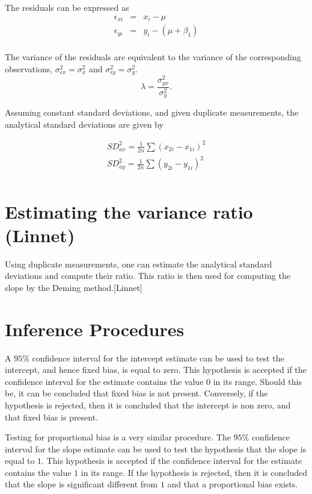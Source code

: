 \documentclass[12pt, a4paper]{report}
\theoremstyle{plain}
\theoremstyle{definition}
\theoremstyle{remark}
\begin{document}
The residuals can be expressed as
\begin{eqnarray*}
	\epsilon_{xi} &=& x_{i} - \mu  \\
	\epsilon_{yi} &=& y_{i} - (\mu + \beta_{1}) \\
\end{eqnarray*}

The variance of the residuals are equivalent to the variance of the corresponding observations, $\sigma^{2}_{\epsilon x} =
\sigma^{2}_{x}$ and $\sigma^{2}_{\epsilon y} = \sigma^{2}_{y}$.
\begin{equation}
	\lambda = \frac{\sigma^{2}_{yx}}{\sigma^{2}_{y}}.
\end{equation}

Assuming constant standard deviations, and given duplicate measurements, the analytical standard deviations are given by

\begin{eqnarray*}
	SD^{2}_{ax} = \frac{1}{2n} \sum (x_{2i} - x_{1i})^{2}\\
	SD^{2}_{ay} = \frac{1}{2n} \sum (y_{2i} - y_{1i})^{2}\\
\end{eqnarray*}


\section{Estimating the variance ratio (Linnet)}

Using duplicate measurements, one can estimate the analytical standard deviations and compute their ratio. This ratio is then used for computing the slope by the Deming method.[Linnet]



\section{Inference Procedures}
A $95\%$ confidence interval for the intercept estimate can be used to test the intercept, and hence fixed bias, is equal to
zero. This hypothesis is accepted if the confidence interval for the estimate contains the value $0$ in its range. Should this be,
it can be concluded that fixed bias is not present. Conversely, if the hypothesis is rejected, then it is concluded that the
intercept is non zero, and that fixed bias is present.

Testing for proportional bias is a very similar procedure. The $95\%$ confidence interval for the slope estimate can be used to
test the hypothesis that the slope is equal to $1$. This hypothesis is accepted if the confidence interval for the estimate
contains the value $1$ in its range. If the hypothesis is rejected, then it is concluded that the slope is significant
different from $1$ and that a proportional bias exists.
\end{document}
